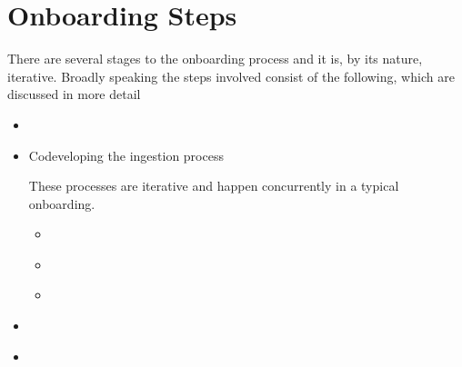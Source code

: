\documentclass[letterpaper,10pt,english]{sphinxmanual}
\begin{document}
\section{Onboarding Steps}
\label{\detokenize{index:onboarding-steps}}
\sphinxAtStartPar
There are several stages to the onboarding process and it is, by its nature, iterative. Broadly speaking the steps involved consist of the following, which are discussed in more detail
\begin{itemize}
\item {} 
\sphinxAtStartPar
{\hyperref[\detokenize{index:prelim}]{}}

\item {} 
\sphinxAtStartPar
Co\sphinxhyphen{}developing the ingestion process %
\begin{footnote}[1]\sphinxAtStartFootnote
These processes are iterative and happen concurrently in a typical onboarding.
%
\end{footnote}
\begin{itemize}
\item {} 
\sphinxAtStartPar
{\hyperref[\detokenize{index:gathering-data}]{}}

\item {} 
\sphinxAtStartPar
{\hyperref[\detokenize{index:ingestion-strat}]{}}

\item {} 
\sphinxAtStartPar
{\hyperref[\detokenize{index:modding-scripts}]{}}

\end{itemize}

\item {} 
\sphinxAtStartPar
{\hyperref[\detokenize{index:testing}]{}}

\item {} 
\sphinxAtStartPar
{\hyperref[\detokenize{index:going-live}]{}}

\end{itemize}
\end{document}
